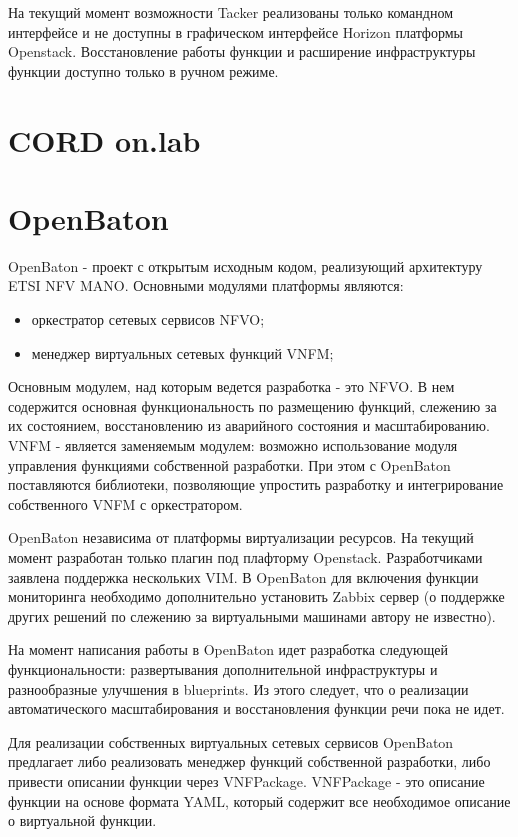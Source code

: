 \documentclass[oneside,final,14pt,a4paper]{extreport}
\begin{document}
На текущий момент возможности Tacker реализованы только командном интерфейсе и не доступны в графическом интерфейсе Horizon платформы Openstack.\cite{tacker-official} 
Восстановление работы функции и расширение инфраструктуры функции доступно только в ручном режиме.

\section{CORD on.lab}


\section{OpenBaton}
OpenBaton - проект с открытым исходным кодом, реализующий архитектуру ETSI NFV MANO. Основными модулями платформы являются:
\begin{itemize}
	\item оркестратор сетевых сервисов NFVO;
	\item менеджер виртуальных сетевых функций VNFM;
\end{itemize}

Основным модулем, над которым ведется разработка - это NFVO. В нем содержится основная функциональность по размещению функций, слежению за их состоянием, восстановлению из аварийного состояния и масштабированию. VNFM - является заменяемым модулем: возможно использование модуля управления функциями собственной разработки. При этом с OpenBaton поставляются библиотеки, позволяющие упростить разработку и интегрирование собственного VNFM с оркестратором.

OpenBaton независима от платформы виртуализации ресурсов. На текущий момент разработан только плагин под плафторму Openstack. Разработчиками заявлена поддержка нескольких VIM. В OpenBaton для включения функции мониторинга необходимо дополнительно установить Zabbix сервер (о поддержке других решений по слежению за виртуальными машинами автору не известно).

На момент написания работы в OpenBaton идет разработка следующей функциональности: развертывания дополнительной инфраструктуры и разнообразные улучшения в blueprints. Из этого следует, что о реализации автоматического масштабирования и восстановления функции речи пока не идет.

Для реализации собственных виртуальных сетевых сервисов OpenBaton предлагает либо реализовать менеджер функций собственной разработки, либо привести описании функции через VNFPackage. VNFPackage - это описание функции на основе формата YAML, который содержит все необходимое описание о виртуальной функции.
\end{document}
